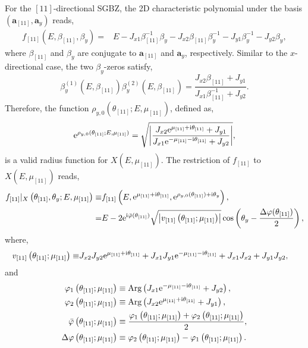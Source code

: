 \documentclass[pdflatex,sn-nature, iicol]{sn-jnl}%
\theoremstyle{thmstyleone}%
\theoremstyle{thmstyletwo}%
\theoremstyle{thmstylethree}%
\begin{document}
For the $[11]$-directional SGBZ, the 2D characteristic polynomial
under the basis $(\mathbf{a}_{[11]},\mathbf{a}_{y})$ reads, 
\begin{align}
f_{[11]}\left(E,\beta_{[11]},\beta_{y}\right)= & E-J_{x1}\beta_{[11]}^{-1}\beta_{y}-J_{x2}\beta_{[11]}\beta_{y}^{-1}-J_{y1}\beta_{y}^{-1}-J_{y2}\beta_{y},
\end{align}
where $\beta_{[11]}$ and $\beta_{y}$ are conjugate to $\mathbf{a}_{[11]}$
and $\mathbf{a}_{y}$, respectively. Similar to the $x$-directional
case, the two $\beta_{y}$-zeros satisfy, 
\begin{equation}
\beta_{y}^{(1)}\left(E,\beta_{[11]}\right)\beta_{y}^{(2)}\left(E,\beta_{[11]}\right)=\frac{J_{x2}\beta_{[11]}+J_{y1}}{J_{x1}\beta_{[11]}^{-1}+J_{y2}}.\label{seq:11-product-beta2-zeros}
\end{equation}
Therefore, the function $\rho_{y,0}(\theta_{[11]};E,\mu_{[11]})$,
defined as, 
\begin{equation}
\mathrm{e}^{\rho_{y,0}(\theta_{[11]};E,\mu_{[11]})}=\sqrt{\left|\frac{J_{x2}\mathrm{e}^{\mu_{[11]}+\mathrm{i}\theta_{[11]}}+J_{y1}}{J_{x1}\mathrm{e}^{-\mu_{[11]}-\mathrm{i}\theta_{[11]}}+J_{y2}}\right|},\label{eq:rho-theta11-11}
\end{equation}
is a valid radius function for $X(E,\mu_{[11]})$. The restriction
of $f_{[11]}$ to $X(E,\mu_{[11]})$ reads, 
\begin{align}
f_{[11]}|_{X}\left(\theta_{[11]},\theta_{y};E,\mu_{[11]}\right)\equiv & f_{[11]}\left(E,\mathrm{e}^{\mu_{[11]}+\mathrm{i}\theta_{[11]}},\mathrm{e}^{\rho_{y,0}(\theta_{[11]})+\mathrm{i}\theta_{y}}\right),\nonumber \\
= & E-2\mathrm{e}^{\mathrm{i}\bar{\varphi}(\theta_{[11]})}\sqrt{\left|v_{[11]}\left(\theta_{[11]};\mu_{[11]}\right)\right|}\cos\left(\theta_{y}-\frac{\Delta\varphi(\theta_{[11]})}{2}\right),\label{eq:ChP-on-X-11}
\end{align}
where, 
\begin{align}
v_{[11]}\left(\theta_{[11]};\mu_{[11]}\right)\equiv & J_{x2}J_{y2}\mathrm{e}^{\mu_{[11]}+\mathrm{i}\theta_{[11]}}+J_{x1}J_{y1}\mathrm{e}^{-\mu_{[11]}-\mathrm{i}\theta_{[11]}}+J_{x1}J_{x2}+J_{y1}J_{y2},\label{eq:v-11}
\end{align}
and 
\begin{align}
\varphi_{1}\left(\theta_{[11]};\mu_{[11]}\right) & \equiv\text{Arg}\left(J_{x1}\mathrm{e}^{-\mu_{[11]}-\mathrm{i}\theta_{[11]}}+J_{y2}\right),\\
\varphi_{2}\left(\theta_{[11]};\mu_{[11]}\right) & \equiv\text{Arg}\left(J_{x2}\mathrm{e}^{\mu_{[11]}+\mathrm{i}\theta_{[11]}}+J_{y1}\right),\\
\bar{\varphi}\left(\theta_{[11]};\mu_{[11]}\right) & \equiv\frac{\varphi_{1}\left(\theta_{[11]};\mu_{[11]}\right)+\varphi_{2}\left(\theta_{[11]};\mu_{[11]}\right)}{2},\\
\Delta\varphi\left(\theta_{[11]};\mu_{[11]}\right) & \equiv\varphi_{2}\left(\theta_{[11]};\mu_{[11]}\right)-\varphi_{1}\left(\theta_{[11]};\mu_{[11]}\right).\label{eq:Delta-varphi}
\end{align}
\end{document}
